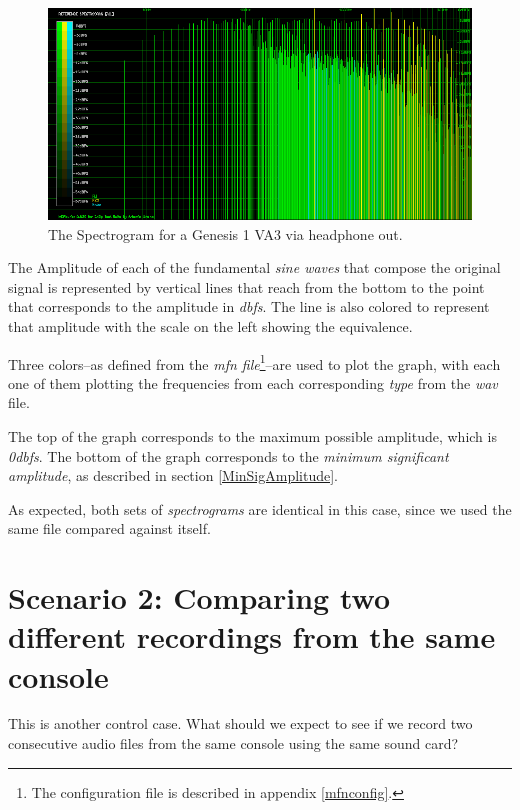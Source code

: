 \documentclass[10pt,a4paper]{report}
\newcommand{\ac}[1]{\textit{\acrshort{#1}}}
\newcommand{\db}[1]{\textit{#1\acrshort{dbfs}}}
\begin{document}
\begin{figure}[H]
	\centering
	\includegraphics[width=1.0\linewidth]{images/interpretation/Plot1-SameFile-Spectrogram.png}
	\caption[Spectrogram]{The Spectrogram for a Genesis 1 VA3 via headphone out.}
	\label{fig:plot2-samefile-fm-spectrogram}
\end{figure}

The Amplitude of each of the fundamental \textit{sine waves} that compose the original signal is represented by vertical lines that reach from the bottom to the point that corresponds to the amplitude in \ac{dbfs}. The line is also colored to represent that amplitude with the scale on the left showing the equivalence.

Three colors--as defined from the \textit{mfn file}\footnote{The configuration file is described in appendix \ref{mfnconfig}.}--are used to plot the graph, with each one of them plotting the frequencies from each corresponding \textit{type} from the \ac{wav} file.

The top of the graph corresponds to the maximum possible amplitude, which is \db{0}. The bottom of the graph corresponds to the \textit{minimum significant amplitude}, as described in section \ref{MinSigAmplitude}.

As expected, both sets of \textit{spectrograms} are identical in this case, since we used the same file compared against itself.

\section{Scenario 2: Comparing two different recordings from the same console}
\label{scenario2}
This is another control case. What should we expect to see if we record two consecutive audio files from the same console using the same sound card?
\end{document}
